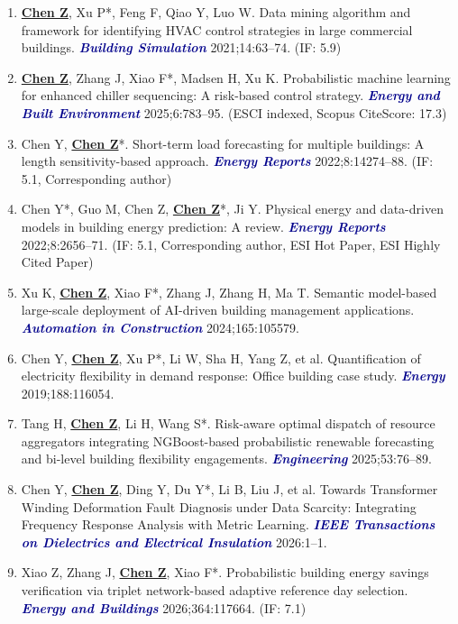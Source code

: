 \documentclass[11pt,a4paper]{article}
\newcommand{\me}[1]{\underline{\textbf{#1}}}
\newcommand{\journal}[1]{\textcolor{darkblue}{\textbf{\textit{#1}}}}
\begin{document}
\begin{enumerate}
\item \me{Chen Z}, Xu P*, Feng F, Qiao Y, Luo W. Data mining algorithm and framework for identifying HVAC control strategies in large commercial buildings. \journal{Building Simulation} 2021;14:63--74. (IF: 5.9)

\item \me{Chen Z}, Zhang J, Xiao F*, Madsen H, Xu K. Probabilistic machine learning for enhanced chiller sequencing: A risk-based control strategy. \journal{Energy and Built Environment} 2025;6:783--95. (ESCI indexed, Scopus CiteScore: 17.3)

\item Chen Y, \me{Chen Z}*. Short-term load forecasting for multiple buildings: A length sensitivity-based approach. \journal{Energy Reports} 2022;8:14274--88. (IF: 5.1, Corresponding author)

\item Chen Y*, Guo M, Chen Z, \me{Chen Z}*, Ji Y. Physical energy and data-driven models in building energy prediction: A review. \journal{Energy Reports} 2022;8:2656--71. (IF: 5.1, Corresponding author, ESI Hot Paper, ESI Highly Cited Paper)

\item Xu K, \me{Chen Z}, Xiao F*, Zhang J, Zhang H, Ma T. Semantic model-based large-scale deployment of AI-driven building management applications. \journal{Automation in Construction} 2024;165:105579.

\item Chen Y, \me{Chen Z}, Xu P*, Li W, Sha H, Yang Z, et al. Quantification of electricity flexibility in demand response: Office building case study. \journal{Energy} 2019;188:116054.

\item Tang H, \me{Chen Z}, Li H, Wang S*. Risk-aware optimal dispatch of resource aggregators integrating NGBoost-based probabilistic renewable forecasting and bi-level building flexibility engagements. \journal{Engineering} 2025;53:76--89.

\item Chen Y, \me{Chen Z}, Ding Y, Du Y*, Li B, Liu J, et al. Towards Transformer Winding Deformation Fault Diagnosis under Data Scarcity: Integrating Frequency Response Analysis with Metric Learning. \journal{IEEE Transactions on Dielectrics and Electrical Insulation} 2026:1--1.

\item Xiao Z, Zhang J, \me{Chen Z}, Xiao F*. Probabilistic building energy savings verification via triplet network-based adaptive reference day selection. \journal{Energy and Buildings} 2026;364:117664. (IF: 7.1)


\end{enumerate}
\end{document}
